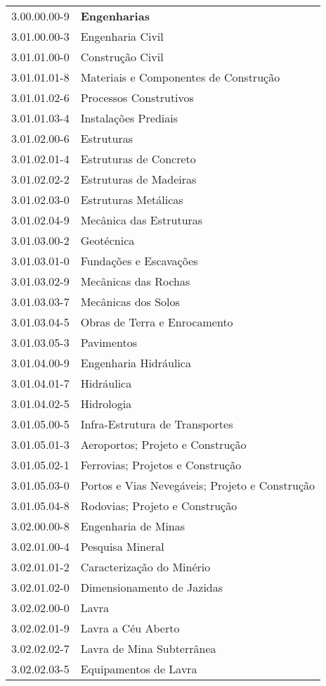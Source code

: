 \begin{longtable}[c]{p{2.15cm}p{13cm}}
3.00.00.00-9 & \textbf{Engenharias} \\
3.01.00.00-3 & Engenharia Civil \\
3.01.01.00-0 & Construção Civil \\
3.01.01.01-8 & Materiais e Componentes de Construção \\
3.01.01.02-6 & Processos Construtivos \\
3.01.01.03-4 & Instalações Prediais \\
3.01.02.00-6 & Estruturas \\
3.01.02.01-4 & Estruturas de Concreto \\
3.01.02.02-2 & Estruturas de Madeiras \\
3.01.02.03-0 & Estruturas Metálicas \\
3.01.02.04-9 & Mecânica das Estruturas \\
3.01.03.00-2 & Geotécnica \\
3.01.03.01-0 & Fundações e Escavações \\
3.01.03.02-9 & Mecânicas das Rochas \\
3.01.03.03-7 & Mecânicas dos Solos \\
3.01.03.04-5 & Obras de Terra e Enrocamento \\
3.01.03.05-3 & Pavimentos \\
3.01.04.00-9 & Engenharia Hidráulica \\
3.01.04.01-7 & Hidráulica \\
3.01.04.02-5 & Hidrologia \\
3.01.05.00-5 & Infra-Estrutura de Transportes \\
3.01.05.01-3 & Aeroportos; Projeto e Construção \\
3.01.05.02-1 & Ferrovias; Projetos e Construção \\
3.01.05.03-0 & Portos e Vias Nevegáveis; Projeto e Construção \\
3.01.05.04-8 & Rodovias; Projeto e Construção \\
3.02.00.00-8 & Engenharia de Minas \\
3.02.01.00-4 & Pesquisa Mineral \\
3.02.01.01-2 & Caracterização do Minério \\
3.02.01.02-0 & Dimensionamento de Jazidas \\
3.02.02.00-0 & Lavra \\
3.02.02.01-9 & Lavra a Céu Aberto \\
3.02.02.02-7 & Lavra de Mina Subterrânea \\
3.02.02.03-5 & Equipamentos de Lavra \\

\end{longtable}
